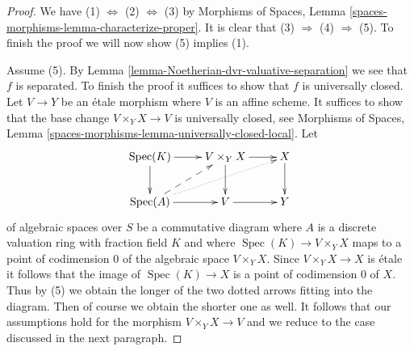 \documentclass{stacks-project}
\theoremstyle{plain}
\theoremstyle{definition}
\theoremstyle{remark}
\numberwithin{equation}{subsection}
\def\Spec{\mathop{\mathrm{Spec}}}
\begin{document}
\begin{proof}
We have (1) $\Leftrightarrow$ (2) $\Leftrightarrow$ (3) by 
Morphisms of Spaces, Lemma \ref{spaces-morphisms-lemma-characterize-proper}.
It is clear that (3) $\Rightarrow$ (4) $\Rightarrow$ (5).
To finish the proof we will now show (5) implies (1).

\medskip\noindent
Assume (5). By Lemma \ref{lemma-Noetherian-dvr-valuative-separation}
we see that $f$ is separated. To finish the proof it suffices to show
that $f$ is universally closed. Let $V \to Y$ be an \'etale morphism
where $V$ is an affine scheme. It suffices to show that the base
change $V \times_Y X \to V$ is universally closed, see
Morphisms of Spaces, Lemma
\ref{spaces-morphisms-lemma-universally-closed-local}.
Let
$$
\xymatrix{
\Spec(K) \ar[r] \ar[d] & V \times_Y X \ar[d] \ar[r] & X \ar[d] \\
\Spec(A) \ar[r] \ar@{-->}[ru] \ar@{..>}[rru] & V \ar[r] & Y
}
$$
of algebraic spaces over $S$
be a commutative diagram where $A$ is a discrete valuation ring
with fraction field $K$ and where $\Spec(K) \to V \times_Y X$
maps to a point of codimension $0$ of the algebraic space
$V \times_Y X$. Since $V \times_Y X \to X$ is \'etale it follows
that the image of $\Spec(K) \to X$ is a point of codimension $0$
of $X$. Thus by (5) we obtain the longer of the two dotted
arrows fitting into the diagram. Then of course we obtain the
shorter one as well. It follows that our assumptions hold for
the morphism $V \times_Y X \to V$ and we reduce to the case discussed
in the next paragraph.


\end{proof}
\end{document}
